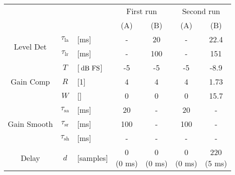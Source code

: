 \documentclass[../main2.tex]{subfiles}
\begin{document}
\begin{tabular}{ c | c l| | c | c || c | c |}

\multicolumn{3}{c||}{} &
	\multicolumn{2}{c||}{First run} &
	\multicolumn{2}{c|}{Second run}\\

\multicolumn{3}{c||}{} &
	(A) & 
	(B) &
	(A) &
	(B) \\
\hline
\multirow{2}{*}{Level Det} &
	$\tau_\text{la}$ & [ms] &
	- &
	20 &
	- &
	22.4 \\
&
	$\tau_\text{lr}$ & [ms] &
	- &
	100 &
	- &
	151 \\
\hline
\multirow{3}{*}{Gain Comp} &
	$T$ & [$\mskip3mu\text{dB~FS}$]&
	-5 &
	-5 &
	-5 &
	-8.9 \\
&
	$R$ & [1]&
	4 &
	4 &
	4 &
	1.73 \\
&
	$W$ & [\dBFS]&
	0 &
	0 &
	0 &
	15.7 \\
\hline
\multirow{3}{*}{Gain Smooth} &
	$\tau_\text{sa}$ & [ms] &
	20 &
	- &
	20 &
	- \\
&
	$\tau_\text{sr}$ & [ms] &
	100 &
	- &
	100 &
	- \\
&
	$\tau_\text{sh}$ & [ms] &
	- &
	- &
	- &
	- \\
\hline
Delay &
	$d$ & [samples]&
	\tblbox{0 \\ (0 ms)} &
	\tblbox{0   \\ (0 ms)} &
	\tblbox{0 \\ (0 ms)} &
	\tblbox{220 \\ (5 ms)} \\
\hline

\end{tabular}
\end{document}
